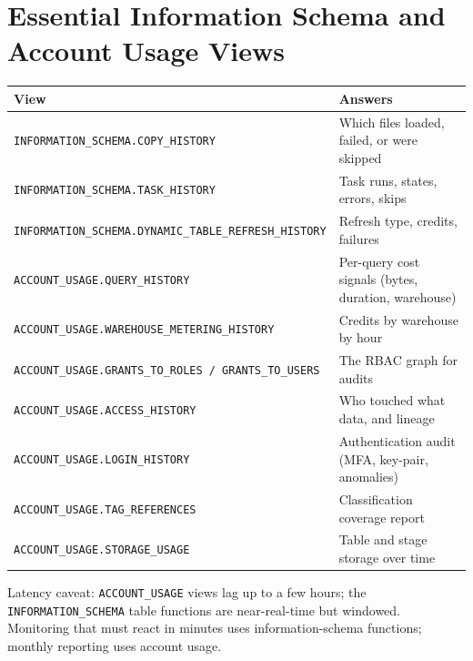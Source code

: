 \section{Essential Information Schema and Account Usage Views}
\begin{center}
\footnotesize
\begin{tabular}{@{}p{5.2cm}p{9.0cm}@{}}
\toprule
\textbf{View} & \textbf{Answers} \\
\midrule
\texttt{INFORMATION\_SCHEMA.COPY\_HISTORY} & Which files loaded, failed, or were skipped \\
\texttt{INFORMATION\_SCHEMA.TASK\_HISTORY} & Task runs, states, errors, skips \\
\texttt{INFORMATION\_SCHEMA.DYNAMIC\_TABLE\_REFRESH\_HISTORY} & Refresh type, credits, failures \\
\texttt{ACCOUNT\_USAGE.QUERY\_HISTORY} & Per-query cost signals (bytes, duration, warehouse) \\
\texttt{ACCOUNT\_USAGE.WAREHOUSE\_METERING\_HISTORY} & Credits by warehouse by hour \\
\texttt{ACCOUNT\_USAGE.GRANTS\_TO\_ROLES / GRANTS\_TO\_USERS} & The RBAC graph for audits \\
\texttt{ACCOUNT\_USAGE.ACCESS\_HISTORY} & Who touched what data, and lineage \\
\texttt{ACCOUNT\_USAGE.LOGIN\_HISTORY} & Authentication audit (MFA, key-pair, anomalies) \\
\texttt{ACCOUNT\_USAGE.TAG\_REFERENCES} & Classification coverage report \\
\texttt{ACCOUNT\_USAGE.STORAGE\_USAGE} & Table and stage storage over time \\
\bottomrule
\end{tabular}
\end{center}

\begin{tipbox}
Latency caveat: \texttt{ACCOUNT\_USAGE} views lag up to a few hours; the \texttt{INFORMATION\_SCHEMA} table functions are near-real-time but windowed. Monitoring that must react in minutes uses information-schema functions; monthly reporting uses account usage.
\end{tipbox}
